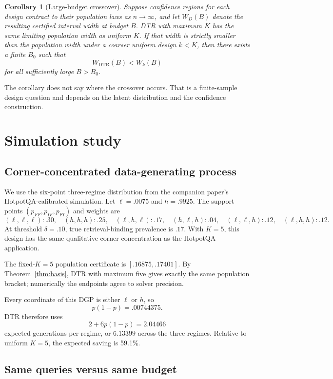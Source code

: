 \documentclass[11pt]{article}
\newtheorem{corollary}{Corollary}
\theoremstyle{remark}
\newcommand{\dtr}{\mathrm{DTR}}
\begin{document}
\begin{corollary}[Large-budget crossover]\label{cor:crossover}
Suppose confidence regions for each design contract to their population laws as $n\to\infty$, and let $W_D(B)$ denote the resulting certified interval width at budget $B$. DTR with maximum $K$ has the same limiting population width as uniform $K$. If that width is strictly smaller than the population width under a coarser uniform design $k<K$, then there exists a finite $B_0$ such that
\[
 W_{\dtr}(B)<W_k(B)
\]
for all sufficiently large $B>B_0$.
\end{corollary}

The corollary does not say where the crossover occurs. That is a finite-sample design question and depends on the latent distribution and the confidence construction.

\section{Simulation study}

\subsection{Corner-concentrated data-generating process}

We use the six-point three-regime distribution from the companion paper's HotpotQA-calibrated simulation. Let $\ell=.0075$ and $h=.9925$. The support points $(p_{FF},p_{IF},p_{FI})$ and weights are
\[
(\ell,\ell,\ell):.30,\quad
(h,h,h):.25,\quad
(\ell,h,\ell):.17,\quad
(h,\ell,h):.04,\quad
(\ell,\ell,h):.12,\quad
(\ell,h,h):.12.
\]
At threshold $\delta=.10$, true retrieval-binding prevalence is $.17$. With $K=5$, this design has the same qualitative corner concentration as the HotpotQA application.

The fixed-$K=5$ population certificate is $[.16875,.17401]$. By Theorem~\ref{thm:basis}, DTR with maximum five gives exactly the same population bracket; numerically the endpoints agree to solver precision.

Every coordinate of this DGP is either $\ell$ or $h$, so
\[
 p(1-p)=.00744375.
\]
DTR therefore uses
\[
 2+6p(1-p)=2.04466
\]
expected generations per regime, or $6.13399$ across the three regimes. Relative to uniform $K=5$, the expected saving is 59.1\%.

\subsection{Same queries versus same budget}
\end{document}
